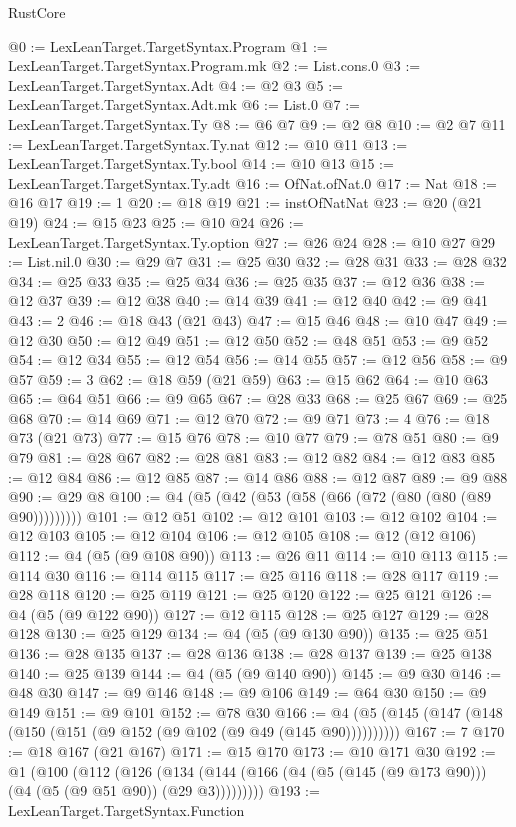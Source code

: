 \begin{lexlean}{RustCore}
\begin{coremodule}
@0 := LexLeanTarget.TargetSyntax.Program
@1 := LexLeanTarget.TargetSyntax.Program.mk
@2 := List.cons.{0}
@3 := LexLeanTarget.TargetSyntax.Adt
@4 := @2 @3
@5 := LexLeanTarget.TargetSyntax.Adt.mk
@6 := List.{0}
@7 := LexLeanTarget.TargetSyntax.Ty
@8 := @6 @7
@9 := @2 @8
@10 := @2 @7
@11 := LexLeanTarget.TargetSyntax.Ty.nat
@12 := @10 @11
@13 := LexLeanTarget.TargetSyntax.Ty.bool
@14 := @10 @13
@15 := LexLeanTarget.TargetSyntax.Ty.adt
@16 := OfNat.ofNat.{0}
@17 := Nat
@18 := @16 @17
@19 := 1
@20 := @18 @19
@21 := instOfNatNat
@23 := @20 (@21 @19)
@24 := @15 @23
@25 := @10 @24
@26 := LexLeanTarget.TargetSyntax.Ty.option
@27 := @26 @24
@28 := @10 @27
@29 := List.nil.{0}
@30 := @29 @7
@31 := @25 @30
@32 := @28 @31
@33 := @28 @32
@34 := @25 @33
@35 := @25 @34
@36 := @25 @35
@37 := @12 @36
@38 := @12 @37
@39 := @12 @38
@40 := @14 @39
@41 := @12 @40
@42 := @9 @41
@43 := 2
@46 := @18 @43 (@21 @43)
@47 := @15 @46
@48 := @10 @47
@49 := @12 @30
@50 := @12 @49
@51 := @12 @50
@52 := @48 @51
@53 := @9 @52
@54 := @12 @34
@55 := @12 @54
@56 := @14 @55
@57 := @12 @56
@58 := @9 @57
@59 := 3
@62 := @18 @59 (@21 @59)
@63 := @15 @62
@64 := @10 @63
@65 := @64 @51
@66 := @9 @65
@67 := @28 @33
@68 := @25 @67
@69 := @25 @68
@70 := @14 @69
@71 := @12 @70
@72 := @9 @71
@73 := 4
@76 := @18 @73 (@21 @73)
@77 := @15 @76
@78 := @10 @77
@79 := @78 @51
@80 := @9 @79
@81 := @28 @67
@82 := @28 @81
@83 := @12 @82
@84 := @12 @83
@85 := @12 @84
@86 := @12 @85
@87 := @14 @86
@88 := @12 @87
@89 := @9 @88
@90 := @29 @8
@100 := @4 (@5 (@42 (@53 (@58 (@66 (@72 (@80 (@80 (@89 @90)))))))))
@101 := @12 @51
@102 := @12 @101
@103 := @12 @102
@104 := @12 @103
@105 := @12 @104
@106 := @12 @105
@108 := @12 (@12 @106)
@112 := @4 (@5 (@9 @108 @90))
@113 := @26 @11
@114 := @10 @113
@115 := @114 @30
@116 := @114 @115
@117 := @25 @116
@118 := @28 @117
@119 := @28 @118
@120 := @25 @119
@121 := @25 @120
@122 := @25 @121
@126 := @4 (@5 (@9 @122 @90))
@127 := @12 @115
@128 := @25 @127
@129 := @28 @128
@130 := @25 @129
@134 := @4 (@5 (@9 @130 @90))
@135 := @25 @51
@136 := @28 @135
@137 := @28 @136
@138 := @28 @137
@139 := @25 @138
@140 := @25 @139
@144 := @4 (@5 (@9 @140 @90))
@145 := @9 @30
@146 := @48 @30
@147 := @9 @146
@148 := @9 @106
@149 := @64 @30
@150 := @9 @149
@151 := @9 @101
@152 := @78 @30
@166 := @4 (@5 (@145 (@147 (@148 (@150 (@151 (@9 @152 (@9 @102 (@9 @49 (@145 @90))))))))))
@167 := 7
@170 := @18 @167 (@21 @167)
@171 := @15 @170
@173 := @10 @171 @30
@192 := @1
    (@100
      (@112
        (@126 (@134 (@144 (@166 (@4 (@5 (@145 (@9 @173 @90))) (@4 (@5 (@9 @51 @90)) (@29 @3)))))))))
@193 := LexLeanTarget.TargetSyntax.Function

\end{coremodule}
\end{lexlean}
